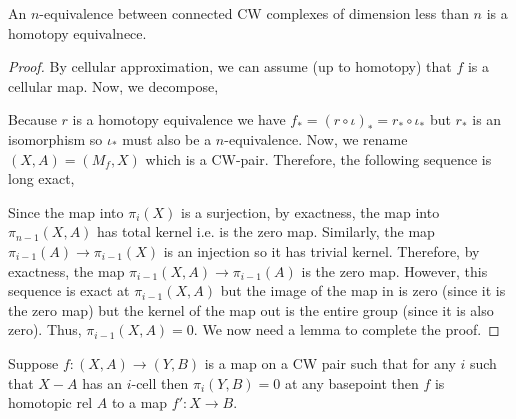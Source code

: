 \documentclass[12pt]{extarticle}
\begin{document}
\begin{theorem}[Whitehead]
An $n$-equivalence between connected CW complexes of dimension less than $n$ is a homotopy equivalnece. 
\end{theorem}

\begin{proof}
By cellular approximation, we can assume (up to homotopy) that $f$ is a cellular map. Now, we decompose,
\begin{center}
\end{center}
Because $r$ is a homotopy equivalence we have $f_* = (r \circ \iota)_* = r_* \circ \iota_*$ but $r_*$ is an isomorphism so $\iota_*$ must also be a $n$-equivalence. Now, we rename $(X, A) = (M_f, X)$ which is a CW-pair. Therefore, the following sequence is long exact,
\begin{center}
\end{center}
Since the map into $\pi_i(X)$ is a surjection, by exactness, the map into $\pi_{n-1}(X, A)$ has total kernel i.e. is the zero map. Similarly, the map $\pi_{i-1}(A) \to \pi_{i-1}(X)$ is an injection so it has trivial kernel. Therefore, by exactness, the map $\pi_{i-1}(X, A) \to \pi_{i-1}(A)$ is the zero map. However, this sequence is exact at $\pi_{i - 1}(X, A)$ but the image of the map in is zero (since it is the zero map) but the kernel of the map out is the entire group (since it is also zero). Thus, $\pi_{i-1}(X, A) = 0$. We now need a lemma to complete the proof.  
\end{proof}

\begin{lemma}
Suppose $f : (X, A) \to (Y, B)$ is a map on a CW pair such that for any $i$ such that $X-A$ has an $i$-cell then $\pi_i(Y, B) = 0$ at any basepoint then $f$ is homotopic rel $A$ to a map $f' : X \to B$. 
\end{lemma}
\end{document}
